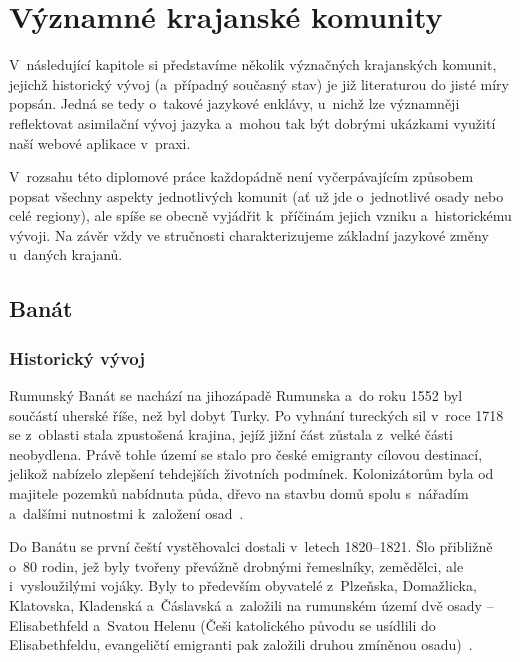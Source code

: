 \hypertarget{vuxfdznamnuxe9-krajanskuxe9-komunity}{%
\chapter{Významné krajanské komunity}\label{vuxfdznamnuxe9-krajanskuxe9-komunity}}

V~následující kapitole si představíme několik význačných krajanských komunit, jejichž historický vývoj (a~případný současný stav) je již literaturou do jisté míry popsán. Jedná se tedy o~takové jazykové enklávy, u~nichž lze významněji reflektovat asimilační vývoj jazyka a~mohou tak být dobrými ukázkami využití naší webové aplikace v~praxi.

V~rozsahu této diplomové práce každopádně není vyčerpávajícím způsobem popsat všechny aspekty jednotlivých komunit (ať už jde o~jednotlivé osady nebo celé regiony), ale spíše se obecně vyjádřit k~příčinám jejich vzniku a~historickému vývoji. Na závěr vždy ve stručnosti charakterizujeme základní jazykové změny u~daných krajanů.

\hypertarget{banuxe1t}{%
\section{Banát}\label{banuxe1t}}

\hypertarget{historickuxfd-vuxfdvoj}{%
\subsection*{Historický vývoj}\label{historickuxfd-vuxfdvoj}}

Rumunský Banát se nachází na jihozápadě Rumunska a~do roku 1552 byl součástí uherské říše, než byl dobyt Turky. Po vyhnání tureckých sil v~roce 1718 se z~oblasti stala zpustošená krajina, jejíž jižní část zůstala z~velké části neobydlena. Právě tohle území se stalo pro české emigranty cílovou destinací, jelikož nabízelo zlepšení tehdejších životních podmínek. Kolonizátorům byla od majitele pozemků nabídnuta půda, dřevo na stavbu domů spolu s~nářadím a~dalšími nutnostmi k~založení osad~\parencite{Secka1995}.

Do Banátu se první čeští vystěhovalci dostali v~letech 1820--1821. Šlo přibližně o~80 rodin, jež byly tvořeny převážně drobnými řemeslníky, zemědělci, ale i~vysloužilými vojáky. Byly to především obyvatelé z~Plzeňska, Domažlicka, Klatovska, Kladenská a~Čáslavská a~založili na rumunském území dvě osady -- Elisabethfeld a~Svatou Helenu (Češi katolického původu se usídlili do Elisabethfeldu, evangeličtí emigranti pak založili druhou zmíněnou osadu)~\parencite{Gecse2013}.

